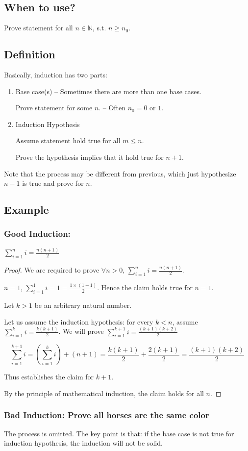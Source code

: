 \subsection{When to use?}

Prove statement for all $n \in \mathbb{N}$, s.t. $n \geq n_0$.

\subsection{Definition}
Basically, induction has two parts:
\begin{enumerate}
\item {Base case(s) -- Sometimes there are more than one base cases.

Prove statement for some $n$. -- Often $n_0 = 0 \text{ or } 1$.}

\item {Induction Hypothesis

Assume statement hold true for all $m \leq n$.

Prove the hypothesis implies that it hold true for $n+1$.}
\end{enumerate}

Note that the process may be different from previous, which just hypothesize $n-1$ is true and prove for $n$.

\subsection{Example}
\subsubsection{Good Induction:}

\Claim  $\displaystyle\sum _{i=1}^n i = \frac{n(n+1)}{2}$

\begin{proof}
We are required to prove $\displaystyle\forall n > 0 \text{, } \sum _{i=1}^n i = \frac{n(n+1)}{2}$.


\BaseCase $n=1$, $\displaystyle\sum _{i=1}^1 i = 1 = \frac{1\times (1+1)}{2}$. Hence the claim holds true for $n=1$.

\InductionStep Let $k > 1$ be an arbitrary natural number.

Let us assume the induction hypothesis: for every $k < n$, assume $\displaystyle\sum _{i=1}^k i = \frac{k(k+1)}{2}$. We will prove $\displaystyle\sum _{i=1}^{k+1} i = \frac{(k+1)(k+2)}{2}$

\begin{equation}
\sum _{i=1}^{k+1} i = \left(\sum _{i=1}^{k} i \right) + (n+1)
                    = \frac{k(k+1)}{2} + \frac{2(k+1)}{2}
                    = \frac{(k+1)(k+2)}{2}
\end{equation}

Thus establishes the claim for $k+1$.

\InductionConclusion By the principle of mathematical induction, the claim holds for all $n$.
\end{proof}

\subsubsection{Bad Induction: Prove all horses are the same color}

The process is omitted. The key point is that: if the base case is not true for induction hypothesis, the induction will not be solid.





